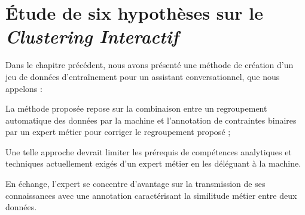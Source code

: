 \chapter{Étude de six hypothèses sur le \textit{Clustering Interactif}}
\label{chapter:4-ETUDES}
	
	Dans le chapitre précédent, nous avons présenté une méthode de création d'un jeu de données d'entraînement pour un assistant conversationnel, que nous appelons  :
	\begin{leftBarImportantGreen}
		\begin{todolist}
			\item[\itemok] La méthode proposée repose sur la combinaison entre un regroupement automatique des données par la machine et l'annotation de contraintes binaires par un expert métier pour corriger le regroupement proposé ;
			\item[\itemok] Une telle approche devrait limiter les prérequis de compétences analytiques et techniques actuellement exigés d'un expert métier en les déléguant à la machine.
			\item[\itemok] En échange, l'expert se concentre d'avantage sur la transmission de ses connaissances avec une annotation caractérisant la similitude métier entre deux données.
		\end{todolist}
	\end{leftBarImportantGreen}
	
